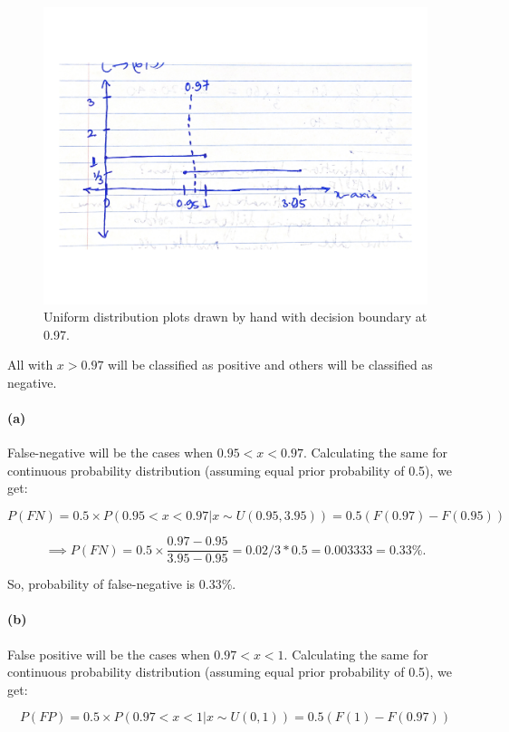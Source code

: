 \documentclass{article}
\begin{document}
\begin{figure}[H]
	\centering
    \includegraphics[width=\textwidth]{plot4.pdf}
    \caption{Uniform distribution plots drawn by hand with decision boundary at 0.97.}
    \label{fig:plot4}
\end{figure}

All with $x>0.97$ will be classified as positive and others will be classified as negative.

\paragraph{(a)} 

False-negative will be the cases when $0.95<x<0.97$. Calculating the same for continuous probability distribution (assuming equal prior probability of 0.5), we get:

$$
P(FN) = 0.5 \times P(0.95<x<0.97 | x \sim U(0.95, 3.95)) = 0.5(F(0.97) - F(0.95))
$$

$$
\implies P(FN) = 0.5 \times \frac{0.97-0.95}{3.95-0.95} = 0.02/3*0.5 = 0.003333 = 0.33\%.
$$

So, probability of false-negative is 0.33\%.

\paragraph{(b)}
False positive will be the cases when $0.97<x<1$. Calculating the same for continuous probability distribution (assuming equal prior probability of 0.5), we get:

$$
P(FP) = 0.5 \times P(0.97<x<1 | x \sim U(0,1)) = 0.5(F(1) - F(0.97))
$$
\end{document}
